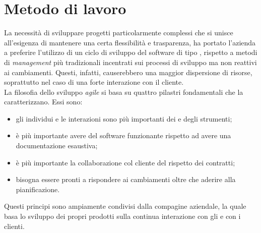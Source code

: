 \section{Metodo di lavoro}
La necessità di sviluppare progetti particolarmente complessi che si unisce all'esigenza di mantenere una certa flessibilità e trasparenza, ha portato l'azienda a preferire l'utilizzo di un ciclo di sviluppo del software di tipo , rispetto a metodi di \emph{management} più tradizionali incentrati sui processi di sviluppo ma non reattivi ai cambiamenti. Questi, infatti, causerebbero una maggior dispersione di risorse, soprattutto nel caso di una forte interazione con il cliente.\\
La filosofia dello sviluppo \emph{agile} si basa su quattro pilastri fondamentali che la caratterizzano.  \newpage
Essi sono:
\begin{itemize}
	\item gli individui e le interazioni sono più importanti dei  e degli strumenti;
	\item è più importante avere del software funzionante rispetto ad avere una documentazione esaustiva;
	\item è più importante la collaborazione col cliente del rispetto dei contratti;
	\item bisogna essere pronti a rispondere ai cambiamenti oltre che aderire alla pianificazione.
\end{itemize}
Questi principi sono ampiamente condivisi dalla compagine aziendale, la quale basa lo sviluppo dei propri prodotti sulla continua interazione con gli  e con i clienti.


